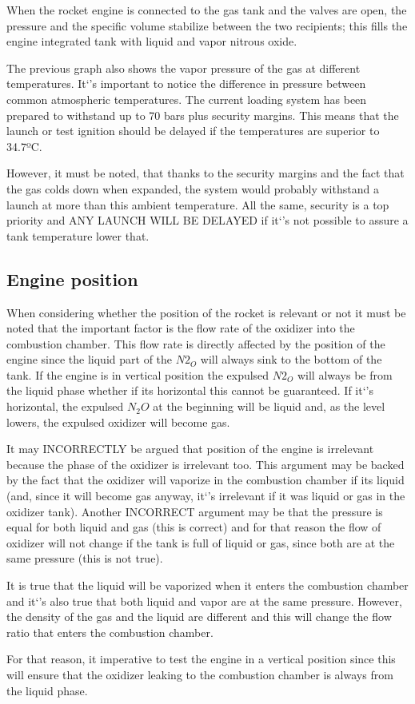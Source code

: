 When the rocket engine is connected to the gas tank and the valves are open, the pressure and the specific volume stabilize between the two recipients; this fills the engine integrated tank with liquid and vapor nitrous oxide.

The previous graph also shows the vapor pressure of the gas at different temperatures. It`'s important to notice the difference in pressure between common atmospheric temperatures. The current loading system has been prepared to withstand up to 70 bars plus security margins. This means that the launch or test ignition should be delayed if the temperatures are superior to 34.7ºC.

However, it must be noted, that thanks to the security margins and the fact that the gas colds down when expanded, the system would probably withstand a launch at more than this ambient temperature. All the same, security is a top priority and ANY LAUNCH WILL BE DELAYED if it`'s not possible to assure a tank temperature lower that.

\subsection*{Engine position}

When considering whether the position of the rocket is relevant or not it must be noted that the important factor is the flow rate of the oxidizer into the combustion chamber. This flow rate is directly affected by the position of the engine since the liquid part of the $N2_O$ will always sink to the bottom of the tank. If the engine is in vertical position the expulsed $N2_O$ will always be from the liquid phase whether if its horizontal this cannot be guaranteed. If it`'s horizontal, the expulsed $N_2O$ at the beginning will be liquid and, as the level lowers, the expulsed oxidizer will become gas.

It may INCORRECTLY be argued that position of the engine is irrelevant because the phase of the oxidizer is irrelevant too. This argument may be backed by the fact that the oxidizer will vaporize in the combustion chamber if its liquid (and, since it will become gas anyway, it`'s irrelevant if it was liquid or gas in the oxidizer tank). Another INCORRECT argument may be that the pressure is equal for both liquid and gas (this is correct) and for that reason the flow of oxidizer will not change if the tank is full of liquid or gas, since both are at the same pressure (this is not true).

It is true that the liquid will be vaporized when it enters the combustion chamber and it`'s also true that both liquid and vapor are at the same pressure. However, the density of the gas and the liquid are different and this will change the flow ratio that enters the combustion chamber.

For that reason, it imperative to test the engine in a vertical position since this will ensure that the oxidizer leaking to the combustion chamber is always from the liquid phase.